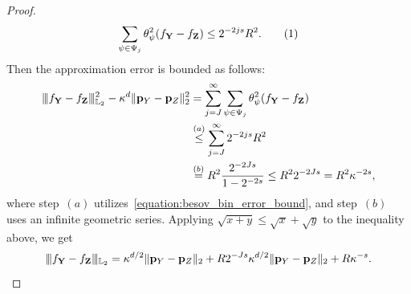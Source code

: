 \documentclass[twoside,11pt]{article}
\newcommand\numberthis{\addtocounter{equation}{1}\tag{\theequation}}
\newcommand{\Ell}{\mathbb{L}}
\newcommand{\EllTwo}{\Ell_2} %
\newcommand{\rvTwo}{Y}
\newcommand{\rvThree}{Z}
\newcommand{\vectorize}[1]{\mathbf{#1}}
\newcommand{\dimDensity}{d} %
\newcommand{\probVec}{\mathbf{p}} %
\newcommand{\smoothness}{s}
\newcommand{\binNum}{\kappa}           %
\newcommand{\wavMotherFunc}{\psi} %
\newcommand{\resLev}{j}
\newcommand{\primResLev}{J}
\newcommand{\wavCoef}{\theta}
\newcommand{\wavGenericMotherCoef}{\wavCoef_{\wavMotherFunc}}
\begin{document}
\begin{appendix}
\begin{proof}
		\begin{align*}
			\sum_{\wavMotherFunc \in {\Psi}_{\resLev}}
			\wavGenericMotherCoef^2(
			f_{\vectorize{Y}}
			-
			f_{\vectorize{Z}}
			)
			\leq
			2^{ -2 \resLev \smoothness}
			R^2.
			\numberthis\label{equation:besov_bin_error_bound}
		\end{align*}
		Then the approximation error is bounded as follows:
		\begin{align*}
			\vert\kern-0.25ex
			\vert\kern-0.25ex
			\vert 
			f_{\vectorize{Y}} - f_{\vectorize{Z}}
			\vert\kern-0.25ex
			\vert\kern-0.25ex
			\vert_{\EllTwo}^2
			-
			\binNum^\dimDensity
			\|\probVec_{\rvTwo} - \probVec_{\rvThree}\|_2^2
			&=
			\sum_{\resLev = \primResLev}^\infty
			\sum_{\psi \in {\Psi}_{\resLev} }
			\wavGenericMotherCoef^2(
			f_{\vectorize{Y}}
			-
			f_{\vectorize{Z}}
			)
			\\ &
			\stackrel{(a)}{\leq}
			\sum_{\resLev = \primResLev}^\infty
			2^{-2\resLev \smoothness} R^2
			\\ &
			\stackrel{(b)}{=}
			R^2 
			\frac{2^{-2 \primResLev \smoothness}
			}{
				1 - 2^{-2\smoothness}
			}
			\leq
			R^2 2^{-2 \primResLev \smoothness}
			=
			R^2 \binNum^{-2\smoothness}
			,
		\end{align*}
		where step~$(a)$ utilizes~\eqref{equation:besov_bin_error_bound},
		and step~$(b)$ uses an infinite geometric series.
		Applying $\sqrt{x+y} \leq \sqrt{x} + \sqrt{y}$ to the inequality above, we get
		\begin{equation*}
			\vert\kern-0.25ex
			\vert\kern-0.25ex
			\vert 
			f_{\vectorize{Y}} - f_{\vectorize{Z}}
			\vert\kern-0.25ex
			\vert\kern-0.25ex
			\vert_{\EllTwo} 
			= 
			\binNum^{\dimDensity/2}
			\|\probVec_{\rvTwo} - \probVec_{\rvThree}\|_2 + R 2^{- \primResLev \smoothness}
			\binNum^{\dimDensity/2}
			\|\probVec_{\rvTwo} - \probVec_{\rvThree}\|_2 + R \binNum^{- \smoothness}.
		\end{equation*}
	\end{proof}
	
	

\end{appendix}
\end{document}
